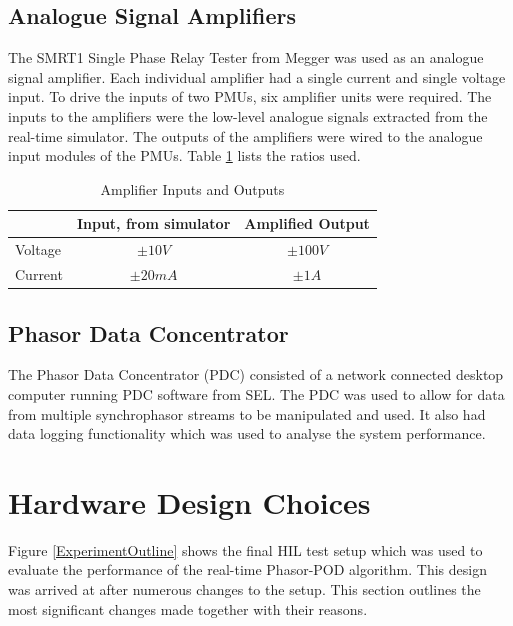 \documentclass[conference]{IEEEtran}
\begin{document}
\subsection{Analogue Signal Amplifiers}
The SMRT1 Single Phase Relay Tester \cite{Megger} from Megger was used as an analogue signal amplifier. Each individual amplifier had a single current and single voltage input. To drive the inputs of two PMUs, six amplifier units were required. The inputs to the amplifiers were the low-level analogue signals extracted from the real-time simulator. The outputs of the amplifiers were wired to the analogue input modules of the PMUs. Table \ref{AmplifierTable} lists the ratios used.

\begin{table}[!ht]
\caption{Amplifier Inputs and Outputs}\label{AmplifierTable}
\begin{center}
\begin{tabular}{|l|c|c|}
\hline \textbf{} & \textbf{Input, from simulator} & \textbf{Amplified Output} \\
\hline Voltage &$\pm10V$&$\pm 100V$\\ 
\hline Current & $\pm 20mA$ & $\pm 1A$\\ 
\hline 
\end{tabular}
\end{center}
\end{table} 

\subsection{Phasor Data Concentrator}
The Phasor Data Concentrator (PDC) consisted of a network connected desktop computer running PDC software from SEL. The PDC was used to allow for data from multiple synchrophasor streams to be manipulated and used. It also had data logging functionality which was used to analyse the system performance.

\section{Hardware Design Choices} \label{Design}
Figure \ref{ExperimentOutline} shows the final HIL test setup which was used to evaluate the performance of the real-time Phasor-POD algorithm. This design was arrived at after numerous changes to the setup. This section outlines the most significant changes made together with their reasons.
\end{document}
